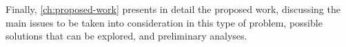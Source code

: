 Finally, \autoref{ch:proposed-work} presents in detail the proposed work, discussing the main issues to be taken into consideration in this type of problem, possible solutions that can be explored, and preliminary analyses.



